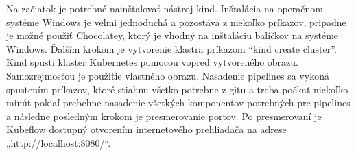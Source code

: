 Na začiatok je potrebné nainštalovať nástroj kind. Inštalácia na operačnom systéme Windows je veľmi jednoduchá a pozostáva z niekoľko príkazov, pripadne je možné použiť Chocolatey, ktorý je vhodný na inštaláciu balíčkov na systéme Windows. Ďalším krokom je vytvorenie klastra príkazom “kind create cluster”.  Kind spusti klaster Kubernetes pomocou vopred vytvoreného obrazu. Samozrejmosťou je použitie vlastného obrazu. Nasadenie pipelines sa vykoná spustením príkazov, ktoré stiahnu všetko potrebne z gitu a treba počkať niekoľko minút pokiaľ prebehne nasadenie všetkých komponentov potrebných pre pipelines a následne posledným krokom je presmerovanie portov. Po presmerovaní je Kubeflow dostupný otvorením internetového prehliadača na adrese „http://localhost:8080/“.
